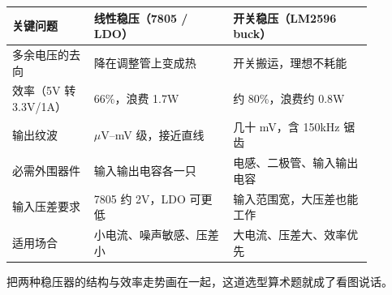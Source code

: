 \begin{longtable}{L{0.2\linewidth}L{0.34\linewidth}L{0.34\linewidth}}
\toprule
关键问题 & 线性稳压（7805 / LDO） & 开关稳压（LM2596 buck） \\
\midrule
多余电压的去向 & 降在调整管上变成热 & 开关搬运，理想不耗能 \\\tablerowrule
效率（5V 转 3.3V/1A） & 66\%，浪费 1.7W & 约 80\%，浪费约 0.8W \\\tablerowrule
输出纹波 & $\mu$V--mV 级，接近直线 & 几十 mV，含 150kHz 锯齿 \\\tablerowrule
必需外围器件 & 输入输出电容各一只 & 电感、二极管、输入输出电容 \\\tablerowrule
输入压差要求 & 7805 约 2V，LDO 可更低 & 输入范围宽，大压差也能工作 \\\tablerowrule
适用场合 & 小电流、噪声敏感、压差小 & 大电流、压差大、效率优先 \\
\bottomrule
\end{longtable}

把两种稳压器的结构与效率走势画在一起，这道选型算术题就成了看图说话。

